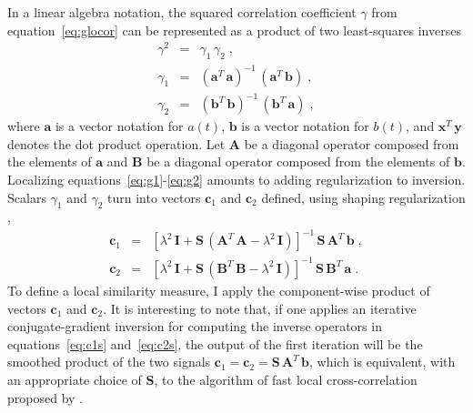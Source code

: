 In a linear algebra notation, the squared correlation coefficient
$\gamma$ from equation~\ref{eq:glocor} can be represented as a
product of two least-squares inverses
\begin{eqnarray}
  \label{eq:g}
  \gamma^2 & = & \gamma_1\,\gamma_2\;, \\
  \label{eq:g1}
  \gamma_1 & = & \left(\mathbf{a}^T\,\mathbf{a}\right)^{-1}\,\left(\mathbf{a}^T\,\mathbf{b}\right)\;, \\
  \label{eq:g2}
  \gamma_2 & = & \left(\mathbf{b}^T\,\mathbf{b}\right)^{-1}\,\left(\mathbf{b}^T\,\mathbf{a}\right)\;, 
\end{eqnarray}
where $\mathbf{a}$ is a vector notation for $a(t)$, $\mathbf{b}$ is a
vector notation for $b(t)$, and $\mathbf{x}^T\,\mathbf{y}$ denotes the
dot product operation. Let $\mathbf{A}$ be a diagonal operator
composed from the elements of $\mathbf{a}$ and $\mathbf{B}$ be a
diagonal operator composed from the elements of $\mathbf{b}$.
Localizing equations~\ref{eq:g1}-\ref{eq:g2} amounts to adding
regularization to inversion. Scalars $\gamma_1$ and $\gamma_2$ turn
into vectors $\mathbf{c}_1$ and $\mathbf{c}_2$ defined, using shaping regularization , 
\begin{eqnarray}
  \label{eq:c1s}
  \mathbf{c}_1 & = & 
  \left[\lambda^2\,\mathbf{I} + 
    \mathbf{S}\,\left(\mathbf{A}^T\,\mathbf{A} - \lambda^2\,\mathbf{I}\right)\right]^{-1}\,
  \mathbf{S}\,\mathbf{A}^T\,\mathbf{b}\;, \\
  \label{eq:c2s}
  \mathbf{c}_2 & = & 
    \left[\lambda^2\,\mathbf{I} + 
      \mathbf{S}\,\left(\mathbf{B}^T\,\mathbf{B} - \lambda^2\,\mathbf{I}\right)\right]^{-1}\,
    \mathbf{S}\,\mathbf{B}^T\,\mathbf{a}\;.
\end{eqnarray}
To define a local similarity measure, I apply the component-wise
product of vectors $\mathbf{c}_1$ and $\mathbf{c}_2$. It is
interesting to note that, if one applies an iterative
conjugate-gradient inversion for computing the inverse operators in
equations~\ref{eq:c1s} and~\ref{eq:c2s}, the output of the first
iteration will be the smoothed product of the two signals
$\mathbf{c}_1 = \mathbf{c}_2 = \mathbf{S}\,\mathbf{A}^T\,\mathbf{b}$,
which is equivalent, with an appropriate choice of $\mathbf{S}$, to the algorithm of fast local cross-correlation
proposed by \cite{hale}.


